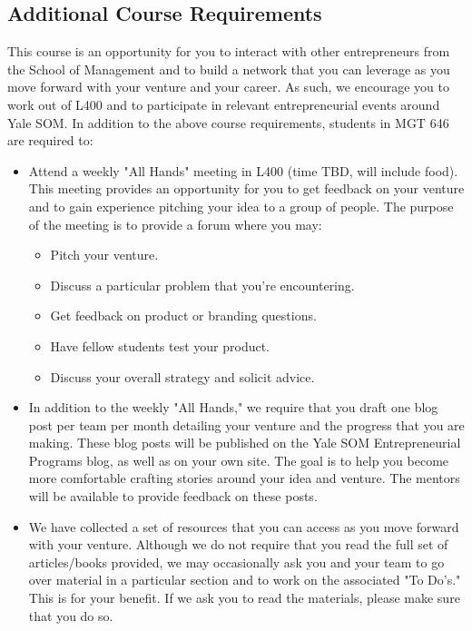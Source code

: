 \subsection*{Additional Course Requirements}

This course is an opportunity for you to interact with other entrepreneurs from the School of Management and to build a network that you can leverage as you move forward with your venture and your career. As such, we encourage you to work out of L400 and to participate in relevant entrepreneurial events around Yale SOM. In addition to the above course requirements, students in MGT 646 are required to:

\begin{itemize}
	\item Attend a weekly "All Hands" meeting in L400 (time TBD, will include food). This meeting provides an opportunity for you to get feedback on your venture and to gain experience pitching your idea to a group of people. The purpose of the meeting is to provide a forum where you may:
		\begin{itemize}
				\item Pitch your venture.
				\item Discuss a particular problem that you're encountering.
				\item Get feedback on product or branding questions.
				\item Have fellow students test your product.
				\item Discuss your overall strategy and solicit advice.
			\end{itemize}
	\item In addition to the weekly "All Hands," we require that you draft one blog post per team per month detailing your venture and the progress that you are making. These blog posts will be published on the Yale SOM Entrepreneurial Programs blog, as well as on your own site. The goal is to help you become more comfortable crafting stories around your idea and venture. The mentors will be available to provide feedback on these posts.
	\item We have collected a set of resources that you can access as you move forward with your venture. Although we do not require that you read the full set of articles/books provided, we may occasionally ask you and your team to go over material in a particular section and to work on the associated "To Do's." This is for your benefit. If we ask you to read the materials, please make sure that you do so.

\end{itemize}

